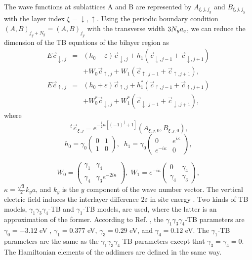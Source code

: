 \documentclass{jpsj3}
\begin{document}
The wave functions at sublattices A and B are represented by
$A_{\xi,j,j_y}$ and $B_{\xi,j,j_y}$
with the layer index $\xi= \downarrow, \uparrow$.
Using the periodic boundary condition 
$(A,B)_{j_y+N_y}=(A,B)_{j_y}$ with the transverse width 
$3N_ya_{\rm c}$, we can reduce the dimension of 
the TB equations of the bilayer region 
as 
\begin{eqnarray}
E\vec{c}_{\downarrow,j}
&=& 
(h_0-\varepsilon)\vec{c}_{\downarrow,j}+h_1\left(\vec{c}_{\downarrow,j-1}+
\vec{c}_{\downarrow,j+1}\right)
\nonumber\\
&& 
+W_0\vec{c}_{\uparrow,j}
+W_1\left(\vec{c}_{\uparrow,j-1}+
\vec{c}_{\uparrow,j+1}
\right),
\label{TB-down}
\end{eqnarray}
\begin{eqnarray}
E\vec{c}_{\uparrow,j}&=& 
(h_0+\varepsilon) \vec{c}_{\uparrow,j}
+h_1^*\left(\vec{c}_{\uparrow,j-1}+
\vec{c}_{\uparrow,j+1}\right)
\nonumber\\
&& 
+W_0^*\vec{c}_{\downarrow,j}
+W_1^*\left(\vec{c}_{\downarrow,j-1}+
\vec{c}_{\downarrow,j+1}
\right),
\label{TB-up}
\end{eqnarray}
where 
\begin{equation}
\;^t\vec{c}_{\xi,j}=e^{-\frac{i}{2}\kappa\left[
(-1)^j+1 \right]} (A_{\xi,j,0}, B_{\xi,j,0}),
\end{equation}
\begin{equation}
h_0 =
\gamma_0\left(
\begin{array}{cc}
0 & 1 \\
1 & 0
\end{array}
\right),\;\;
h_1=
\gamma_0\left(
\begin{array}{cc}
0 & e^{i\kappa}
\\
e^{-i\kappa} & 0
\end{array}
\right),
\end{equation}

\begin{equation}
W_0= \left(
\begin{array}{cc}
\gamma_1 & \gamma_4 \\
\gamma_4 & 
\gamma_3e^{-2i\kappa}
\end{array}
\right),\;
W_1= 
e^{-i\kappa} \left(
\begin{array}{cc}
0 & \gamma_4
\\
\gamma_4 & \gamma_3
\end{array}
\right),
\end{equation}
$\kappa= \frac{\sqrt{3}}{2}k_ya$, and $k_y$ is the $y$ component of the wave number vector.
The vertical electric field induces the interlayer difference $2\varepsilon$ in site energy \cite{note}.
Two kinds of TB models, $\gamma_1\gamma_3\gamma_4$-TB
and $\gamma_1$-TB models,
are used, where
the latter is an approximation of the former.
According to Ref. \cite{TB-parameter} , 
the $\gamma_1\gamma_3\gamma_4$-TB parameters 
are $\gamma_0=-3.12$ eV , $\gamma_1=0.377$ eV, $\gamma_3=0.29$ eV, and 
$\gamma_4=0.12$ eV.
The $\gamma_1$-TB parameters are the same as the $\gamma_1\gamma_3\gamma_4$-TB parameters except that $\gamma_3=\gamma_4=0$.
The Hamiltonian elements of the addimers are defined in the same way.
\end{document}
